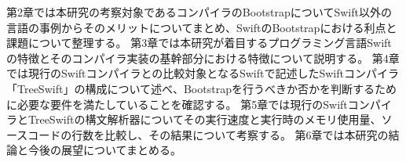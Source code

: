 第2章では本研究の考察対象であるコンパイラのBootstrapについてSwift以外の言語の事例からそのメリットについてまとめ、SwiftのBootstrapにおける利点と課題について整理する。
第3章では本研究が着目するプログラミング言語Swiftの特徴とそのコンパイラ実装の基幹部分における特徴について説明する。
第4章では現行のSwiftコンパイラとの比較対象となるSwiftで記述したSwiftコンパイラ「TreeSwift」の構成について述べ、Bootstrapを行うべきか否かを判断するために必要な要件を満たしていることを確認する。
第5章では現行のSwiftコンパイラとTreeSwiftの構文解析器についてその実行速度と実行時のメモリ使用量、ソースコードの行数を比較し、その結果について考察する。
第6章では本研究の結論と今後の展望についてまとめる。

